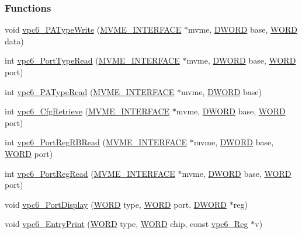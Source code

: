 \subsubsection*{Functions}
\begin{DoxyCompactItemize}
\item 
void \hyperlink{vpc6_8h_aeebefabbb82c5db323d9d80f554586ce}{vpc6\_\-PATypeWrite} (\hyperlink{structMVME__INTERFACE}{MVME\_\-INTERFACE} $\ast$mvme, \hyperlink{vt2_8h_a798af1e30bc65f319c1a246cecf59e39}{DWORD} base, \hyperlink{vt2_8h_a2b0e863dadf920709ec53d9088ee7c91}{WORD} data)
\item 
int \hyperlink{vpc6_8h_ac870864055cc5eea66f7229a2bd44073}{vpc6\_\-PortTypeRead} (\hyperlink{structMVME__INTERFACE}{MVME\_\-INTERFACE} $\ast$mvme, \hyperlink{vt2_8h_a798af1e30bc65f319c1a246cecf59e39}{DWORD} base, \hyperlink{vt2_8h_a2b0e863dadf920709ec53d9088ee7c91}{WORD} port)
\item 
int \hyperlink{vpc6_8h_afb94d63b60eab3d570396b532e3fdeec}{vpc6\_\-PATypeRead} (\hyperlink{structMVME__INTERFACE}{MVME\_\-INTERFACE} $\ast$mvme, \hyperlink{vt2_8h_a798af1e30bc65f319c1a246cecf59e39}{DWORD} base)
\item 
int \hyperlink{vpc6_8h_a7def69c129b90426d2c5834b18d1b81f}{vpc6\_\-CfgRetrieve} (\hyperlink{structMVME__INTERFACE}{MVME\_\-INTERFACE} $\ast$mvme, \hyperlink{vt2_8h_a798af1e30bc65f319c1a246cecf59e39}{DWORD} base, \hyperlink{vt2_8h_a2b0e863dadf920709ec53d9088ee7c91}{WORD} port)
\item 
int \hyperlink{vpc6_8h_a0d9b6b536c70f925f3abe043310b3f64}{vpc6\_\-PortRegRBRead} (\hyperlink{structMVME__INTERFACE}{MVME\_\-INTERFACE} $\ast$mvme, \hyperlink{vt2_8h_a798af1e30bc65f319c1a246cecf59e39}{DWORD} base, \hyperlink{vt2_8h_a2b0e863dadf920709ec53d9088ee7c91}{WORD} port)
\item 
int \hyperlink{vpc6_8h_a03b97f9c9cb620dfa76f19cefacb4f4e}{vpc6\_\-PortRegRead} (\hyperlink{structMVME__INTERFACE}{MVME\_\-INTERFACE} $\ast$mvme, \hyperlink{vt2_8h_a798af1e30bc65f319c1a246cecf59e39}{DWORD} base, \hyperlink{vt2_8h_a2b0e863dadf920709ec53d9088ee7c91}{WORD} port)
\item 
void \hyperlink{vpc6_8h_a30c15080312a5dbb3bfb9bc4e1b21202}{vpc6\_\-PortDisplay} (\hyperlink{vt2_8h_a2b0e863dadf920709ec53d9088ee7c91}{WORD} type, \hyperlink{vt2_8h_a2b0e863dadf920709ec53d9088ee7c91}{WORD} port, \hyperlink{vt2_8h_a798af1e30bc65f319c1a246cecf59e39}{DWORD} $\ast$reg)
\item 
void \hyperlink{vpc6_8h_acba11652b38f9148081dc825bb79ccd5}{vpc6\_\-EntryPrint} (\hyperlink{vt2_8h_a2b0e863dadf920709ec53d9088ee7c91}{WORD} type, \hyperlink{vt2_8h_a2b0e863dadf920709ec53d9088ee7c91}{WORD} chip, const \hyperlink{unionvpc6__Reg}{vpc6\_\-Reg} $\ast$v)
\end{DoxyCompactItemize}


